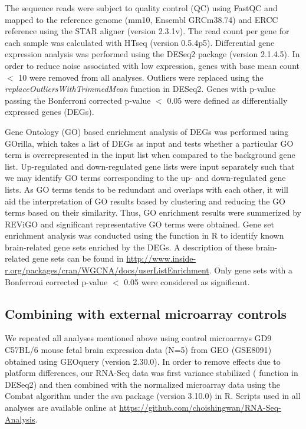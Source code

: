 The sequence reads were subject to quality control (QC) using FastQC \cite{SimonAndrews} and mapped to the  reference genome (mm10, Ensembl GRCm38.74) and ERCC reference using the STAR aligner (version 2.3.1v)\cite{Dobin2013}.
The read count per gene for each sample was calculated with HTseq (version 0.5.4p5)\cite{Anders.2011}.
Differential gene expression analysis was performed using the DESeq2 package (version 2.1.4.5)\cite{Anders2010}.
In order to reduce noise associated with low expression, genes with base mean count $<$ 10 were removed from all analyses.
Outliers were replaced using the \textit{replaceOutliersWithTrimmedMean} function in DESeq2\cite{Anders2010}. 
Genes with p-value passing the Bonferroni corrected p-value $<$ 0.05 were defined as differentially expressed genes (DEGs). 

Gene Ontology (GO) based enrichment analysis of DEGs was performed using GOrilla\cite{Eden2009}, which takes a list of DEGs as input and tests whether a particular GO term is overrepresented in the input list when compared to the background gene list.
Up-regulated and down-regulated gene lists were input separately such that we may identify GO terms corresponding to the up- and down-regulated gene lists.
As GO terms tends to be redundant and overlaps with each other, it will aid the interpretation of GO results based by clustering and reducing the GO terms based on their similarity. 
Thus, GO enrichment results were summerized by REViGO\cite{Supek2011} and significant representative GO terms were obtained.
Gene set enrichment analysis was conducted using the \cite{Miller2011} function in R to identify known brain-related gene sets enriched by the DEGs.
A description of these brain-related gene sets can be found in \url{http://www.inside-r.org/packages/cran/WGCNA/docs/userListEnrichment}.
Only gene sets with a Bonferroni corrected p-value $<$ 0.05 were considered as significant. 

\subsection{Combining with external microarray controls}
We repeated all analyses mentioned above using control microarrays GD9 C57BL/6 mouse fetal brain expression data (N=5) from GEO (GSE8091\cite{Hartl2008}) obtained using GEOquery (version 2.30.0)\cite{Davis2007}.
In order to remove effects due to platform differences, our RNA-Seq data was first variance stabilized ( function in DESeq2\cite{Anders2010}) and then combined with the  normalized microarray data using the Combat algorithm\cite{Johnson2007} under the sva package (version 3.10.0) in R.
Scripts used in all analyses are available online at \url{https://github.com/choishingwan/RNA-Seq-Analysis}. 

